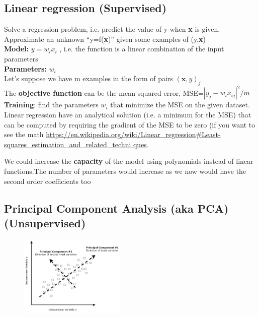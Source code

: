 \subsection{Linear regression (Supervised)}

Solve a regression problem, i.e. predict the value of y when \textbf{x} is given. Approximate an unknown “y=f(\textbf{x})” given some examples of (y,\textbf{x})\\

\textbf{Model:} $y=w_ix_i$ , i.e. the function is a linear combination of the input parameters\\

\textbf{Parameters:} $ w_i$\\

Let’s suppose we have m examples in the form of pairs $(\textbf{x},y)_j$\\

The \textbf{objective function} can be the mean squared error, MSE=$|y_j - w_i x_{ij} |^2/m$\\

\textbf{Training}: find the parameters $w_i$ that minimize the MSE on the given dataset. Linear regression have an analytical solution (i.e. a minimum for the MSE) that can be computed by requiring the gradient of the MSE to be zero (if you want to see the math \url{https://en.wikipedia.org/wiki/Linear_regression#Least-squares_estimation_and_related_techni
	ques}.

We could increase the \textbf{capacity} of the model using polynomials instead of linear functions.The number of parameters would increase as we now would have the second order
coefficients too
\subsection{Principal Component Analysis (aka PCA) (Unsupervised)}

\begin{figure}
	\includegraphics[width=0.45\textwidth]{figure_ml/pca.png}
\end{figure} 

